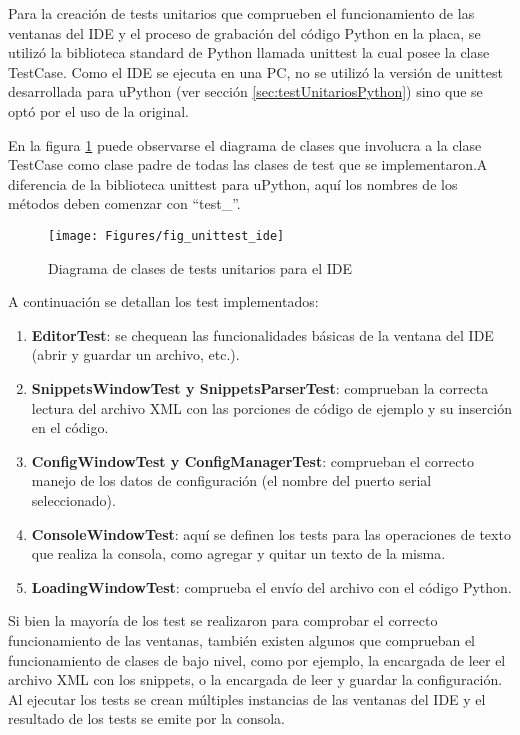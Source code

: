 Para la creación de tests unitarios que comprueben el funcionamiento de las ventanas del IDE y el proceso de grabación del código Python en la placa, se utilizó la biblioteca standard de Python llamada unittest la cual posee la clase TestCase. Como el IDE se ejecuta en una PC, no se utilizó la versión de unittest desarrollada para uPython (ver sección \ref{sec:testUnitariosPython}) sino que se optó por el uso de la original.

En la figura \ref{fig:unittestide} puede observarse el diagrama de clases que involucra a la clase TestCase como clase padre de todas las clases de test que se implementaron.A diferencia de la biblioteca unittest para uPython, aquí los nombres de los métodos deben comenzar con “test\_”.

\begin{figure}[h]
  \centering
    \texttt{[image: Figures/fig\_unittest\_ide]}
  \caption{Diagrama de clases de tests unitarios para el IDE}
  \label{fig:unittestide}
\end{figure}

A continuación se detallan los test implementados:

\begin{enumerate}
	\item  \textbf{EditorTest}: se chequean las funcionalidades básicas de la ventana del IDE (abrir y guardar un archivo, etc.).
	\item  \textbf{SnippetsWindowTest y SnippetsParserTest}: comprueban la correcta lectura del archivo XML con las porciones de código de ejemplo y su inserción en el código.
	\item  \textbf{ConfigWindowTest y ConfigManagerTest}: comprueban el correcto manejo de los datos de configuración (el nombre del puerto serial seleccionado).
	\item  \textbf{ConsoleWindowTest}: aquí se definen los tests para las operaciones de texto que realiza la consola, como agregar y quitar un texto de la misma.
	\item  \textbf{LoadingWindowTest}: comprueba el envío del archivo con el código Python.
\end{enumerate}

Si bien la mayoría de los test se realizaron para comprobar el correcto funcionamiento de las ventanas, también existen algunos que comprueban el funcionamiento de clases de bajo nivel, como por ejemplo, la encargada de leer el archivo XML con los snippets, o la encargada de leer y guardar la configuración. Al ejecutar los tests se crean múltiples instancias de las ventanas del IDE y el resultado de los tests se emite por la consola.




